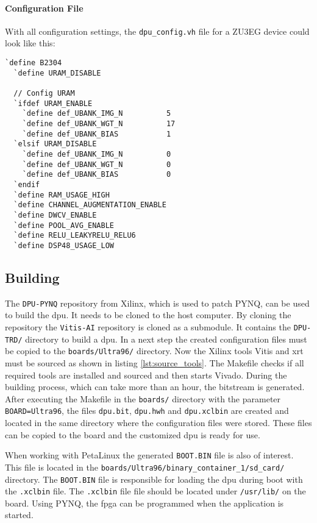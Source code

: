 \paragraph{Configuration File}
With all configuration settings, the \texttt{dpu\_config.vh} file for a ZU3EG device could look like this:

\begin{lstlisting}[style=bash, caption={DPU configuration}, label=lst:config_dpu]
  `define B2304
  `define URAM_DISABLE 

  // Config URAM
  `ifdef URAM_ENABLE
    `define def_UBANK_IMG_N          5
    `define def_UBANK_WGT_N          17
    `define def_UBANK_BIAS           1
  `elsif URAM_DISABLE
    `define def_UBANK_IMG_N          0
    `define def_UBANK_WGT_N          0
    `define def_UBANK_BIAS           0
  `endif
  `define RAM_USAGE_HIGH
  `define CHANNEL_AUGMENTATION_ENABLE
  `define DWCV_ENABLE
  `define POOL_AVG_ENABLE
  `define RELU_LEAKYRELU_RELU6
  `define DSP48_USAGE_LOW
\end{lstlisting}

\subsection{Building}
\label{subsec:embedded_platform:dpu:building}

The \texttt{DPU-PYNQ} repository from Xilinx, which is used to patch PYNQ, can be used to build the \acrshort{dpu}.
It needs to be cloned to the host computer.
By cloning the repository the \texttt{Vitis-AI} repository is cloned as a submodule.
It contains the \texttt{DPU-TRD/} directory to build a \acrshort{dpu}.
In a next step the created configuration files must be copied to the \texttt{boards/Ultra96/} directory.
Now the Xilinx tools Vitis and \acrshort{xrt} must be sourced as shown in listing \ref{lst:source_tools}.
The Makefile checks if all required tools are installed and sourced and then starts Vivado.
During the building process, which can take more than an hour, the bitstream is generated. 
After executing the Makefile in the \texttt{boards/} directory with the parameter \texttt{BOARD=Ultra96}, the files \texttt{dpu.bit}, \texttt{dpu.hwh} and \texttt{dpu.xclbin} are created and located in the same directory where the configuration files were stored.
These files can be copied to the board and the customized \acrshort{dpu} is ready for use.

When working with PetaLinux the generated \texttt{BOOT.BIN} file is also of interest.
This file is located in the \texttt{boards/Ultra96/binary\_container\_1/sd\_card/} directory.
The \texttt{BOOT.BIN} file is responsible for loading the \acrshort{dpu} during boot with the \texttt{.xclbin} file.
The \texttt{.xclbin} file file should be located under \texttt{/usr/lib/} on the board.
Using PYNQ, the \acrshort{fpga} can be programmed when the application is started.

